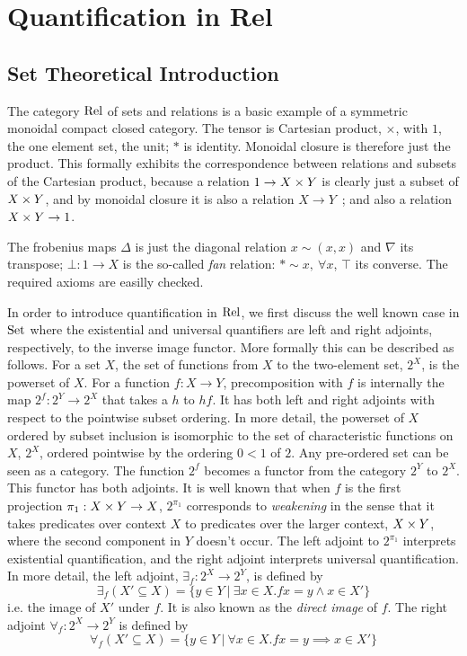 \section{Quantification in Rel}
\subsection{Set Theoretical Introduction}


The category $\mathrm{Rel}$ of sets and relations is a basic example of a
symmetric monoidal compact closed category. The tensor is Cartesian
product, $\times$, with $1$, the one element set, the unit; $*$ is
identity. Monoidal closure is therefore just the product. This
formally exhibits the correspondence between relations and subsets of
the Cartesian product, because a relation $ 1 \to X \times Y $ is clearly
just a subset of $X \times Y$, and by monoidal closure it
is also a relation $ X \to Y $~; and also a relation $X \times Y
\to 1$.


The frobenius maps $\Delta$ is just 
the diagonal relation $x \sim (x,x)$ and $\nabla$ its transpose; $\bot : 1
\to X$ is the so-called \emph{fan} relation: $\ast \sim x, ~  \forall
x$, $\top$ its converse. The required axioms are easilly checked. 


In order to introduce quantification in $\mathrm{Rel}$, we first discuss the
well known case in $\mathrm{Set}$ where the existential and universal
quantifiers are left and right adjoints, respectively, to the inverse
image functor.
%
More formally this can be described as follows. For a set $X$, the set
of functions from $X$ to the two-element set, $2^X$, is the powerset
of $X$.  For a function $f : X \to Y$, precomposition with $f$ is
internally the map $2^f : 2^Y \to 2^X$ that takes a $h$ to $hf$.  It
has both left and right adjoints with respect to the pointwise subset
ordering. In more detail, the powerset of $X$ ordered by subset
inclusion is isomorphic to the set of characteristic functions on $X$,
$2^X$, ordered pointwise by the ordering $0 < 1$ of $2$.  Any
pre-ordered set can be seen as a category. The function $2^f$ becomes
a functor from the category $2^Y$ to $2^X$. This functor has both
adjoints. It is well known that when $f$ is the first projection
$\pi_1 : X\times Y \to X$, $2^{\pi_1}$ corresponds to \emph{weakening} in
the sense that it takes predicates over context $X$ to predicates over
the larger context, $X \times Y$, where the second component in $Y$
doesn't occur.  The left adjoint to $2^{\pi_1}$ interprets existential
quantification, and the right adjoint interprets universal
quantification. In more detail, the left adjoint, $\exists_f : 2^X \to
2^Y$, is defined by
\[\exists_f (X' \subseteq X) = \{ y \in Y ~|~ \exists x \in X. f x = y
\wedge x \in X'\} \]
i.e. the image of $X'$ under $f$. It is also known as the
\emph{direct image} of $f$.
The right adjoint $\forall_f : 2^X
\to 2^Y$ is defined by 
%
\[
\forall_f (X' \subseteq X) = \{ y \in Y ~|~ \forall x \in X. f x = y
\implies x \in X' \} \] 
%


